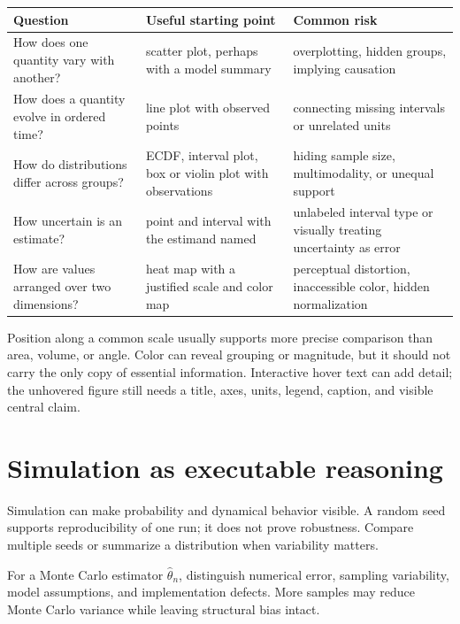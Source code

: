 \begin{longtable}{@{}>{\raggedright\arraybackslash}p{}
>{\raggedright\arraybackslash}p{}
>{\raggedright\arraybackslash}p{}@{}}
\toprule
\textbf{Question} & \textbf{Useful starting point} & \textbf{Common risk} \\
\midrule
\endhead
How does one quantity vary with another? & scatter plot, perhaps with a
model summary & overplotting, hidden groups, implying causation \\
How does a quantity evolve in ordered time? & line plot with observed points &
connecting missing intervals or unrelated units \\
How do distributions differ across groups? & ECDF, interval plot, box or violin
plot with observations & hiding sample size, multimodality, or unequal support \\
How uncertain is an estimate? & point and interval with the estimand named &
unlabeled interval type or visually treating uncertainty as error \\
How are values arranged over two dimensions? & heat map with a justified scale
and color map & perceptual distortion, inaccessible color, hidden normalization \\
\bottomrule
\end{longtable}

Position along a common scale usually supports more precise comparison than
area, volume, or angle. Color can reveal grouping or magnitude, but it should
not carry the only copy of essential information. Interactive hover text can
add detail; the unhovered figure still needs a title, axes, units, legend,
caption, and visible central claim.

\section{Simulation as executable reasoning}

Simulation can make probability and dynamical behavior visible. A random seed
supports reproducibility of one run; it does not prove robustness. Compare
multiple seeds or summarize a distribution when variability matters.

For a Monte Carlo estimator $\widehat{\theta}_n$, distinguish numerical error,
sampling variability, model assumptions, and implementation defects. More
samples may reduce Monte Carlo variance while leaving structural bias intact.

